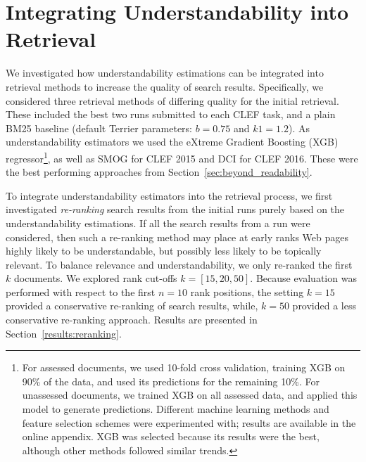 \section{Integrating Understandability into Retrieval}
\label{sec:experiments}


We investigated how understandability estimations can be integrated into retrieval methods to increase the quality of search results. %
Specifically, we considered three retrieval methods of differing quality for the initial retrieval. These included the best two runs submitted to each CLEF task, and a plain BM25 baseline (default Terrier parameters: $b=0.75$ and $k1=1.2$). As understandability estimators we used the eXtreme Gradient Boosting (XGB) regressor\footnote{For assessed documents, we used 10-fold cross validation, training XGB on 90\% of the data, and used its predictions for the remaining 10\%. For unassessed documents, we trained XGB on all assessed data, and applied this model to generate predictions. Different machine learning methods and feature selection schemes were experimented with; results are available in the online appendix. XGB was selected because its results were the best, although other methods followed similar trends.}\cite{chen16}, as well as SMOG for CLEF 2015 and DCI for CLEF 2016. These were the best performing approaches from Section~\ref{sec:beyond_readability}.

To integrate understandability estimators into the retrieval process, we first investigated \textit{re-ranking} search results from the initial runs purely based on the understandability estimations. 
If all the search results from a run were considered, then such a re-ranking method may place at early ranks Web pages highly likely to be understandable, but possibly less likely to be topically relevant. To balance relevance and understandability, we only re-ranked the first $k$ documents. We explored rank cut-offs $k = [15, 20, 50]$. Because evaluation was performed with respect to the first $n=10$ rank positions, the setting $k=15$ provided a conservative re-ranking of search results, while, $k=50$ provided a less conservative re-ranking approach. Results are presented in Section~\ref{results:reranking}.

